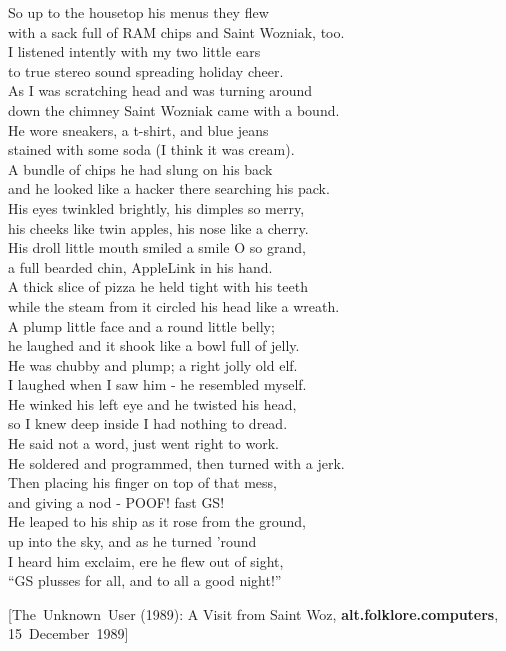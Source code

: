 \documentclass{report}
\newcommand{\citeusenet}[7]
{\hfill{\rmfamily\footnotesize[\mbox{#1} (#3): #4, {\bfseries#5}, \mbox{#7 #3}]}}
\newenvironment{usenet}{\raggedright\small\ttfamily}{\rmfamily}
\begin{document}
\begin{usenet}
		So up to the housetop his menus they flew\\
		with a sack full of RAM chips and Saint Wozniak, too.\\
		I listened intently with my two little ears\\
		to true stereo sound spreading holiday cheer.\\
		As I was scratching head and was turning around\\
		down the chimney Saint Wozniak came with a bound.\\
		He wore sneakers, a t-shirt, and blue jeans\\
		stained with some soda (I think it was cream).\\
		A bundle of chips he had slung on his back\\
		and he looked like a hacker there searching his pack.\\
		His eyes twinkled brightly, his dimples so merry,\\
		his cheeks like twin apples, his nose like a cherry.\\
		His droll little mouth smiled a smile O so grand,\\
		a full bearded chin, AppleLink in his hand.\\
		A thick slice of pizza he held tight with his teeth\\
		while the steam from it circled his head like a wreath.\\
		A plump little face and a round little belly;\\
		he laughed and it shook like a bowl full of jelly.\\
		He was chubby and plump; a right jolly old elf.\\
		I laughed when I saw him - he resembled myself.\\
		He winked his left eye and he twisted his head,\\
		so I knew deep inside I had nothing to dread.\\
		He said not a word, just went right to work.\\
		He soldered and programmed, then turned with a jerk.\\
		Then placing his finger on top of that mess,\\
		and giving a nod - POOF! fast GS!\\
		He leaped to his ship as it rose from the ground,\\
		up into the sky, and as he turned 'round\\
		I heard him exclaim, ere he flew out of sight,\\
		``GS plusses for all, and to all a good night!''

		\citeusenet{The Unknown User}{unknown@ucscb.ucsc.edu}{1989}{A Visit from Saint Woz}{alt.folklore.computers}{\_mXEGBQNF\_A}
			{15 December}
	\end{usenet}
\end{document}
